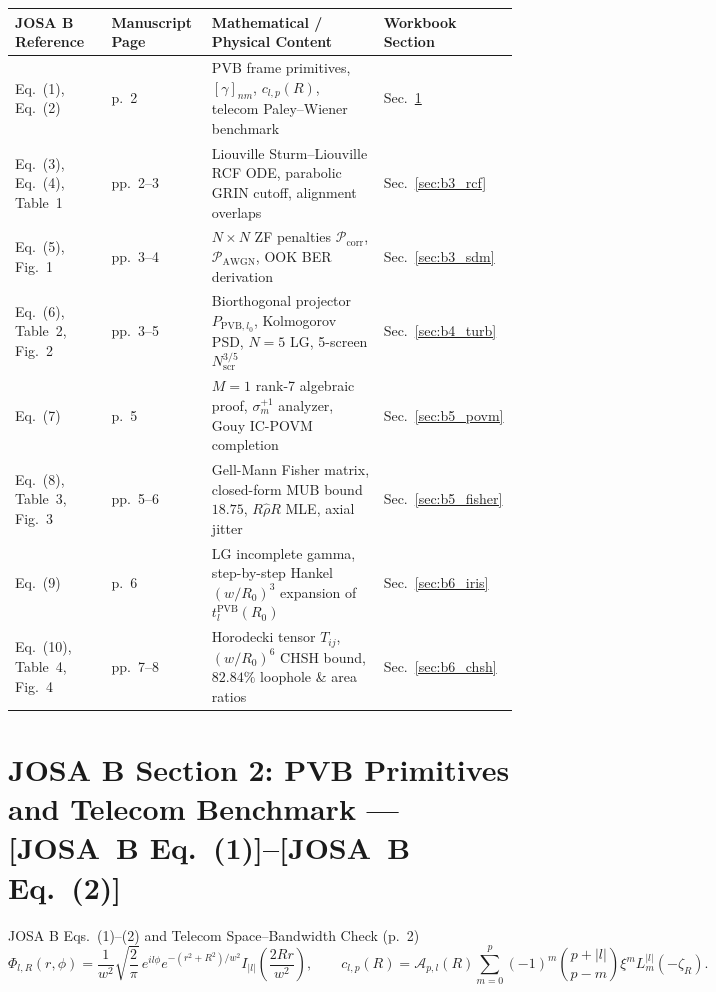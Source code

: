 \documentclass[10pt,letterpaper]{article}
\newcommand{\abs}[1]{\lvert #1 \rvert}
\newcommand{\josb}[1]{\textbf{[JOSA~B Eq.~(#1)]}}
\numberwithin{equation}{section}
\begin{document}
\begin{table}[ht!]
\centering
\scriptsize
\renewcommand{\arraystretch}{1.15}
\setlength{\tabcolsep}{4pt}
\begin{tabular}{@{}llll@{}}
\toprule
\textbf{JOSA B Reference} & \textbf{Manuscript Page} & \textbf{Mathematical / Physical Content} & \textbf{Workbook Section} \\
\midrule
Eq.~(1), Eq.~(2) & p.~2 & PVB frame primitives, $[\gamma]_{nm}$, $c_{l,p}(R)$, telecom Paley--Wiener benchmark & Sec.~\ref{sec:b2_prim} \\
Eq.~(3), Eq.~(4), Table~1 & pp.~2--3 & Liouville Sturm--Liouville RCF ODE, parabolic GRIN cutoff, alignment overlaps & Sec.~\ref{sec:b3_rcf} \\
Eq.~(5), Fig.~1 & pp.~3--4 & $N\times N$ ZF penalties $\mathcal{P}_{\mathrm{corr}}$, $\mathcal{P}_{\mathrm{AWGN}}$, OOK BER derivation & Sec.~\ref{sec:b3_sdm} \\
Eq.~(6), Table~2, Fig.~2 & pp.~3--5 & Biorthogonal projector $P_{\mathrm{PVB},l_0}$, Kolmogorov PSD, $N=5$ LG, 5-screen $N_{\mathrm{scr}}^{3/5}$ & Sec.~\ref{sec:b4_turb} \\
Eq.~(7) & p.~5 & $M=1$ rank-7 algebraic proof, $\sigma_m^{+1}$ analyzer, Gouy IC-POVM completion & Sec.~\ref{sec:b5_povm} \\
Eq.~(8), Table~3, Fig.~3 & pp.~5--6 & Gell-Mann Fisher matrix, closed-form MUB bound $18.75$, $R\hat{\rho}R$ MLE, axial jitter & Sec.~\ref{sec:b5_fisher} \\
Eq.~(9) & p.~6 & LG incomplete gamma, step-by-step Hankel $(w/R_0)^3$ expansion of $t_l^{\mathrm{PVB}}(R_0)$ & Sec.~\ref{sec:b6_iris} \\
Eq.~(10), Table~4, Fig.~4 & pp.~7--8 & Horodecki tensor $T_{ij}$, $(w/R_0)^6$ CHSH bound, $82.84\%$ loophole \& area ratios & Sec.~\ref{sec:b6_chsh} \\
\bottomrule
\end{tabular}
\end{table}

\section{JOSA B Section 2: PVB Primitives and Telecom Benchmark --- \josb{1}--\josb{2}}
\label{sec:b2_prim}

\begin{targeteq}{JOSA B Eqs.~(1)--(2) and Telecom Space--Bandwidth Check (p.~2)}
\[
  \Phi_{l,R}(r,\phi) = \frac{1}{w^2}\sqrt{\frac{2}{\pi}}\,e^{il\phi}e^{-(r^2+R^2)/w^2} I_{\abs{l}}\!\left(\frac{2Rr}{w^2}\right), \qquad
  c_{l,p}(R) = \mathcal{A}_{p,l}(R)\sum_{m=0}^p (-1)^m \binom{p+\abs{l}}{p-m}\xi^m L_m^{\abs{l}}(-\zeta_R).
\]
\end{targeteq}
\end{document}
